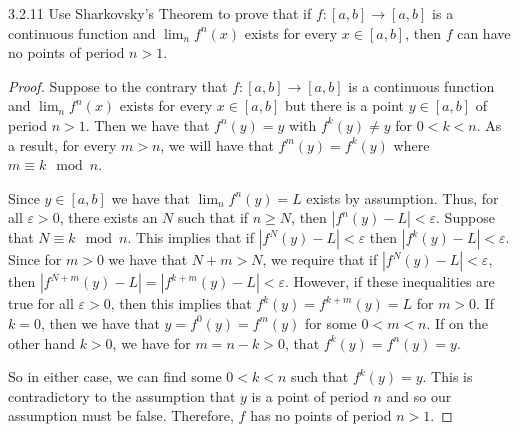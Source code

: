 \begin{problem}{3.2.11}
  Use Sharkovsky's Theorem to prove that if $f: [a, b] \to [a, b]$ is a continuous
  function and $\lim_n f^n(x)$ exists for every $x \in [a, b]$, then $f$ can have no points of
  period $n > 1$.
\end{problem}

\begin{proof}
  Suppose to the contrary that $f: [a, b] \to [a, b]$ is a continuous
  function and $\lim_n f^n(x)$ exists for every $x \in [a, b]$ but there is a
  point $y\in [a,b]$ of period $n>1$. Then we have that $f^n(y) = y$ with $f^k(y) \neq y$ for $0 < k < n$.
  As a result, for every $m > n$, we will have that $f^m(y) = f^k(y)$ where $m \equiv k \mod n$.

  Since $y\in [a,b]$ we have that $\lim_n f^n(y) = L$ exists by assumption. Thus, for all $\varepsilon >0$,
  there exists an $N$ such that if $n \geq N$, then $|f^n(y) - L | < \varepsilon$. Suppose that $N \equiv k \mod n$.
  This implies that if $|f^N(y) - L| < \varepsilon$ then $|f^k(y) - L| < \varepsilon$.
  Since for $m > 0$ we have that $N + m > N$, we require that if
  $|f^N(y) - L| < \varepsilon$, then $|f^{N+m}(y) - L| = |f^{k+m}(y) - L| < \varepsilon$.
  However, if these inequalities are true for all $\varepsilon >0$, then
  this implies that $f^k(y) = f^{k+m}(y) = L$ for $m > 0$.
  If $k=0$, then we have that $y = f^0(y) = f^m(y)$ for some $0 < m < n$.
  If on the other hand $k > 0$, we have for $m = n-k > 0$, that $f^k(y) = f^{n}(y) = y$.

  So in either case, we can find some $0 < k < n$ such that $f^k(y) = y$.
  This is contradictory to the assumption that $y$ is a point of period $n$ and so our assumption must be false.
  Therefore, $f$ has no points of period $n  > 1$.


\end{proof}
\newpage
